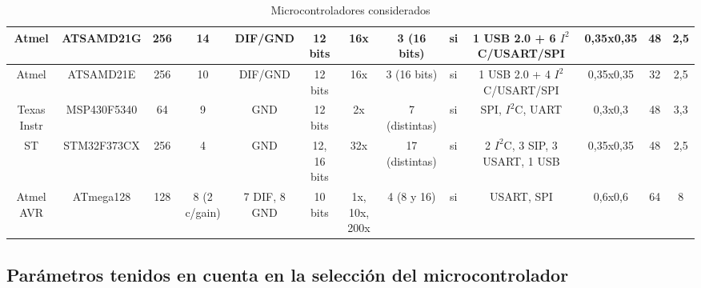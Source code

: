 \documentclass{article}
\theoremstyle{definition}
\theoremstyle{remark}
\begin{document}
\begin{landscape}
\begin{table}[!]
\begin{flushleft}
{\begin{tabular}{|c|c|c|c|c|c|c|c|c|c|c|c|c|}
\hline
 Atmel & ATSAMD21G &    256 &     14 & DIF/GND & 12 bits &    16x & 3 (16 bits) &     si & 1 USB 2.0 + 6 $I^{2}$C/USART/SPI & 0,35x0,35 &     48 &    2,5 \\
\hline
 Atmel & ATSAMD21E &    256 &     10 & DIF/GND & 12 bits &    16x & 3 (16 bits) &     si & 1 USB 2.0 + 4 $I^{2}$C/USART/SPI & 0,35x0,35 &     32 &    2,5 \\
\hline
Texas Instr & MSP430F5340 &     64 &      9 &    GND & 12 bits &     2x & 7 (distintas) &     si & SPI, $I^{2}$C, UART & 0,3x0,3 &     48 &    3,3 \\
\hline
    ST & STM32F373CX &    256 &      4 &    GND & 12, 16 bits &    32x & 17 (distintas) &     si & 2 $I^{2}$C, 3 SIP, 3 USART, 1 USB & 0,35x0,35 &     48 &    2,5 \\
\hline
Atmel AVR & ATmega128 &    128 & 8 (2 c/gain) & 7 DIF, 8 GND & 10 bits & 1x, 10x, 200x & 4 (8 y 16) &     si & USART, SPI & 0,6x0,6 &     64 &      8 \\
\hline
\end{tabular}



}
\end{flushleft}
  \caption{\small Microcontroladores considerados}\label{tab:microcontroladores}
\end{table}

\end{landscape}

\subsection{Parámetros tenidos en cuenta en la selección del microcontrolador} %
\label{sub:parametros_tenidos_en_cuenta_en_la_seleccion_del_microcontrolador}
\end{document}
